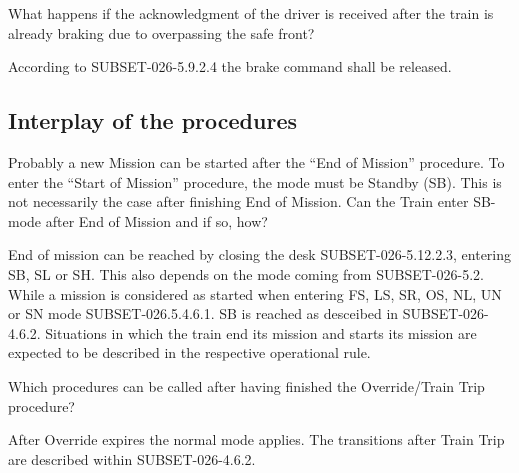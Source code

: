 \documentclass{template/openetcs_article}
\begin{document}
What happens if the acknowledgment of the driver is received after the train is already braking due to overpassing the safe front?

\resolution According to SUBSET-026-5.9.2.4 the brake command shall be released.

\subsection{Interplay of the procedures}

Probably a new Mission can be started after the ``End of Mission'' procedure.
To enter the ``Start of Mission'' procedure, the mode must be Standby (SB).
This is not necessarily the case after finishing End of Mission. 
Can the Train enter SB-mode after End of Mission and if so, how?

\resolution End of mission can be reached by closing the desk SUBSET-026-5.12.2.3, entering SB, SL or SH. This also depends on the mode coming from SUBSET-026-5.2. While a mission is considered as started when entering FS, LS, SR, OS, NL, UN or SN mode SUBSET-026.5.4.6.1. SB is reached as desceibed in SUBSET-026-4.6.2. Situations in which the train end its mission and starts its mission are expected to be described in the respective operational rule.


Which procedures can be called after having finished the Override/Train Trip procedure?

\resolution After Override expires the normal mode applies. The transitions after Train Trip are described within SUBSET-026-4.6.2.








\end{document}
